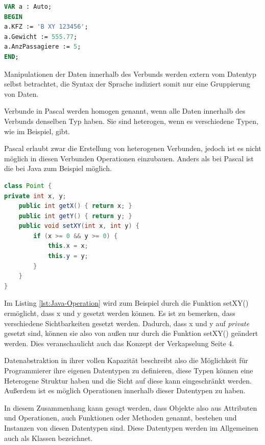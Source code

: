 \documentclass[
	12pt, %
	a4paper,
	listof=totoc, %
	bibliography=totoc, %
	numbers=noenddot, %
	ngerman, %
	headsepline, %
	oneside %
	]{scrbook} %
\begin{document}
\begin{lstlisting}[language=Pascal, caption=Verbund Beispiel Instantiierung \cite{PascalVerbund}, label={lst:record2}]
VAR a : Auto;
BEGIN
a.KFZ := 'B XY 123456';
a.Gewicht := 555.77;
a.AnzPassagiere := 5;
END;
\end{lstlisting}

Manipulationen der Daten innerhalb des Verbunds werden extern vom Datentyp selbst betrachtet, die Syntax der Sprache indiziert somit nur eine Gruppierung von Daten.

Verbunde in Pascal werden homogen genannt, wenn alle Daten innerhalb des Verbunds denselben Typ haben. Sie sind heterogen, wenn es verschiedene Typen, wie im Beispiel, gibt.

Pascal erlaubt zwar die Erstellung von heterogenen Verbunden, jedoch ist es nicht möglich in diesen Verbunden Operationen einzubauen. Anders als bei Pascal ist die bei Java zum Beispiel möglich.  

\begin{lstlisting}[language=Java, caption=Operation innerhalb einer Klasse \cite{OOPL}, label={lst:Java-Operation}]
class Point {
private int x, y;
	public int getX() { return x; }
	public int getY() { return y; }
	public void setXY(int x, int y) {
		if (x >= 0 && y >= 0) {
			this.x = x;
			this.y = y;
		}
	}
}
\end{lstlisting}

Im Listing \ref{lst:Java-Operation} wird zum Beispiel durch die Funktion \glqq setXY()\grqq{}  ermöglicht, dass x und y gesetzt werden können. Es ist zu bemerken, dass verschiedene Sichtbarkeiten gesetzt werden. Dadurch, dass x und y auf \emph{private} gesetzt sind, können sie also von außen nur durch die Funktion \glqq setXY()\grqq{} geändert werden.  
Dies veranschaulicht auch das Konzept der Verkapselung \cite{OOPL} Seite 4.  

Datenabstraktion in ihrer vollen Kapazität beschreibt also die Möglichkeit für Programmierer ihre eigenen Datentypen zu definieren, diese Typen können eine Heterogene Struktur haben und die Sicht auf diese kann eingeschränkt werden. Außerdem ist es möglich Operationen innerhalb dieser Datentypen zu haben.  

In diesem Zusammenhang kann gesagt werden, dass Objekte also aus Attributen und Operationen, auch Funktionen oder Methoden genannt, bestehen und Instanzen von diesen Datentypen sind. Diese Datentypen werden im Allgemeinen auch als Klassen bezeichnet.
\end{document}
